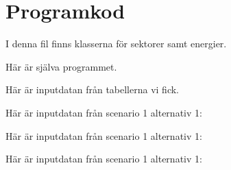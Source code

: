 \documentclass[a4paper,11pt,fleqn, titlepage]{article}
\begin{document}
\section{Programkod}                                                                 
I denna fil finns klasserna för sektorer samt energier.                              
                                 
                                                                                     
\newpage                                                                             
Här är själva programmet.                                                            
                                   
                                                                                     
\newpage                                                                             
Här är inputdatan från tabellerna vi fick.                                             
  

Här är inputdatan från scenario 1 alternativ 1:
  

Här är inputdatan från scenario 1 alternativ 1:
  

Här är inputdatan från scenario 1 alternativ 1:
  
\end{document}
